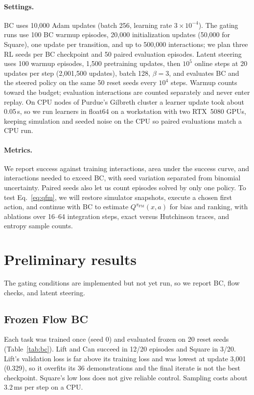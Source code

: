 \documentclass[10pt]{article}
\newcommand{\piFM}{\pi_{\mathrm{FM}}}
\begin{document}
\paragraph{Settings.}
BC uses 10{,}000 Adam updates (batch 256, learning rate $3\times10^{-4}$). The
gating runs use 100 BC warmup episodes, 20{,}000 initialization updates (50{,}000
for Square), one update per transition, and up to 500{,}000 interactions; we
plan three RL seeds per BC checkpoint and 50 paired evaluation episodes.
Latent steering uses 100 warmup episodes, 1{,}500 pretraining updates, then
$10^5$ online steps at 20 updates per step (2{,}001{,}500 updates), batch 128,
$\beta=3$, and evaluates BC and the steered policy on the same 50 reset seeds
every $10^4$ steps. Warmup counts toward the budget; evaluation interactions are
counted separately and never enter replay. On CPU nodes of Purdue's Gilbreth
cluster a learner update took about 0.05\,s, so we run learners in float64 on a
workstation with two RTX~5080 GPUs, keeping simulation and seeded noise on the
CPU so paired evaluations match a CPU run.

\paragraph{Metrics.}
We report success against training interactions, area under the success curve,
and interactions needed to exceed BC, with seed variation separated from
binomial uncertainty. Paired seeds also let us count episodes solved by only one
policy. To test Eq.~\eqref{eq:qfm}, we will restore simulator snapshots, execute
a chosen first action, and continue with BC to estimate $Q^{\piFM}(x,a)$ for
bias and ranking, with ablations over 16--64 integration steps, exact versus
Hutchinson traces, and entropy sample counts.

\section{Preliminary results}

The gating conditions are implemented but not yet run, so we report BC, flow
checks, and latent steering.

\subsection{Frozen Flow BC}

Each task was trained once (seed 0) and evaluated frozen on 20 reset seeds
(Table~\ref{tab:bc}). Lift and Can succeed in 12/20 episodes and Square in 3/20.
Lift's validation loss is far above its training loss and was lowest at update
3{,}001 (0.329), so it overfits its 36 demonstrations and the final iterate is
not the best checkpoint. Square's low loss does not give reliable control.
Sampling costs about 3.2\,ms per step on a CPU.
\end{document}
